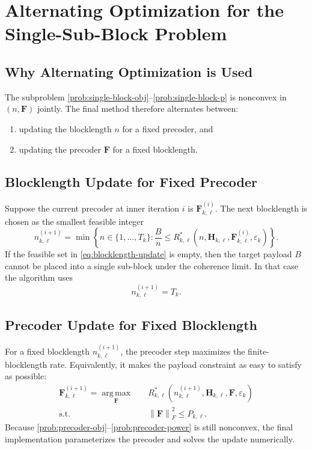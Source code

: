 \documentclass[11pt]{article}
\newcommand{\F}{\mathbf{F}}
\newcommand{\Hc}{\mathbf{H}}
\newcommand{\argmax}{\operatorname*{arg\,max}}
\newcommand{\norm}[1]{\left\lVert #1 \right\rVert}
\begin{document}
\section{Alternating Optimization for the Single-Sub-Block Problem}
\subsection{Why Alternating Optimization is Used}
The subproblem \eqref{prob:single-block-obj}--\eqref{prob:single-block-p} is nonconvex in $(n,\F)$ jointly. The final method therefore alternates between:
\begin{enumerate}
    \item updating the blocklength $n$ for a fixed precoder, and
    \item updating the precoder $\F$ for a fixed blocklength.
\end{enumerate}

\subsection{Blocklength Update for Fixed Precoder}
Suppose the current precoder at inner iteration $i$ is $\F^{(i)}_{k,\ell}$. The next blocklength is chosen as the smallest feasible integer
\begin{equation}
n_{k,\ell}^{(i+1)}
=
\min
\left\{
n \in \{1,\dots,T_k\} :
\frac{B}{n}
\le
R_{k,\ell}^*(n,\Hc_{k,\ell},\F_{k,\ell}^{(i)},\varepsilon_k)
\right\}.
\label{eq:blocklength-update}
\end{equation}
If the feasible set in \eqref{eq:blocklength-update} is empty, then the target payload $B$ cannot be placed into a single sub-block under the coherence limit. In that case the algorithm uses
\begin{equation}
n_{k,\ell}^{(i+1)} = T_k.
\label{eq:blocklength-fallback}
\end{equation}

\subsection{Precoder Update for Fixed Blocklength}
For a fixed blocklength $n_{k,\ell}^{(i+1)}$, the precoder step maximizes the finite-blocklength rate. Equivalently, it makes the payload constraint as easy to satisfy as possible:
\begin{subequations}
\begin{align}
\F_{k,\ell}^{(i+1)}
=
\argmax_{\F}\quad
&
R_{k,\ell}^*(n_{k,\ell}^{(i+1)},\Hc_{k,\ell},\F,\varepsilon_k)
\label{prob:precoder-obj}
\\
\text{s.t.}\quad
&
\norm{\F}_F^2 \le P_{k,\ell}.
\label{prob:precoder-power}
\end{align}
\end{subequations}
Because \eqref{prob:precoder-obj}--\eqref{prob:precoder-power} is still nonconvex, the final implementation parameterizes the precoder and solves the update numerically.
\end{document}
